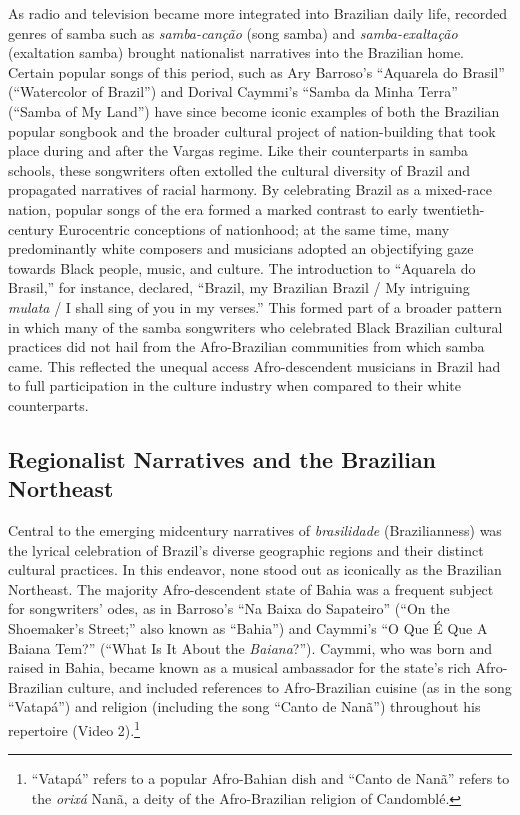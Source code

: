 \documentclass[twoside]{article}
\begin{document}
As radio and television became more integrated into Brazilian daily
life, recorded genres of samba such as \emph{samba-canção} (song samba)
and \emph{samba-exaltação} (exaltation samba) brought nationalist
narratives into the Brazilian home. Certain popular songs of this
period, such as Ary Barroso's ``Aquarela do Brasil'' (``Watercolor of
Brazil'') and Dorival Caymmi's ``Samba da Minha Terra'' (``Samba of My
Land'') have since become iconic examples of both the Brazilian popular
songbook and the broader cultural project of nation-building that took
place during and after the Vargas regime. Like their counterparts in
samba schools, these songwriters often extolled the cultural diversity
of Brazil and propagated narratives of racial harmony. By celebrating
Brazil as a mixed-race nation, popular songs of the era formed a marked
contrast to early twentieth-century Eurocentric conceptions of
nationhood; at the same time, many predominantly white composers and
musicians adopted an objectifying gaze towards Black people, music, and
culture. The introduction to ``Aquarela do Brasil,'' for instance,
declared, ``Brazil, my Brazilian Brazil / My intriguing \emph{mulata} /
I shall sing of you in my verses.'' This formed part of a broader
pattern in which many of the samba songwriters who celebrated Black
Brazilian cultural practices did not hail from the Afro-Brazilian
communities from which samba came. This reflected the unequal access
Afro-descendent musicians in Brazil had to full participation in the
culture industry when compared to their white counterparts.

\hypertarget{regionalist-narratives-and-the-brazilian-northeast}{%
\subsection*{Regionalist Narratives and the Brazilian
Northeast}\label{regionalist-narratives-and-the-brazilian-northeast}}

Central to the emerging midcentury narratives of \emph{brasilidade}
(Brazilianness) was the lyrical celebration of Brazil's diverse
geographic regions and their distinct cultural practices. In this
endeavor, none stood out as iconically as the Brazilian Northeast. The
majority Afro-descendent state of Bahia was a frequent subject for
songwriters' odes, as in Barroso's ``Na Baixa do Sapateiro'' (``On the
Shoemaker's Street;'' also known as ``Bahia'') and Caymmi's ``O Que É
Que A Baiana Tem?'' (``What Is It About the \emph{Baiana}?''). Caymmi,
who was born and raised in Bahia, became known as a musical ambassador
for the state's rich Afro-Brazilian culture, and included references to
Afro-Brazilian cuisine (as in the song ``Vatapá'') and religion
(including the song ``Canto de Nanã'') throughout his repertoire (Video
2).\footnote{``Vatapá'' refers to a popular Afro-Bahian dish and ``Canto
  de Nanã'' refers to the \emph{orixá} Nanã, a deity of the
  Afro-Brazilian religion of Candomblé.}
\end{document}
